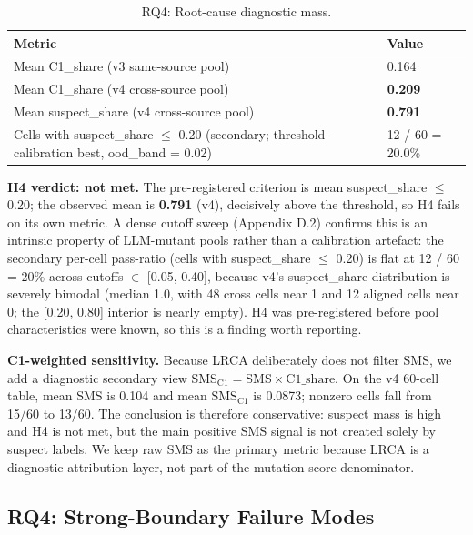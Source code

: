 \documentclass[manuscript,screen,review]{acmart}
\begin{document}
\begin{table}[t]
\caption{RQ4: Root-cause diagnostic mass.}
\label{tab:p2-13}
\centering
\begin{tabular}{ll}
\toprule
Metric & Value \\
\midrule
Mean C1\_share (v3 same-source pool) & 0.164 \\
Mean C1\_share (v4 cross-source pool) & \textbf{0.209} \\
Mean suspect\_share (v4 cross-source pool) & \textbf{0.791} \\
Cells with suspect\_share $\leq$ 0.20 (secondary; threshold-calibration best, ood\_band = 0.02) & 12 / 60 = 20.0\% \\
\bottomrule
\end{tabular}
\end{table}

\textbf{H4 verdict: not met.} The pre-registered criterion is mean
suspect\_share $\leq$ 0.20; the observed mean is \textbf{0.791} (v4),
decisively above the threshold, so H4 fails on its own metric. A dense
cutoff sweep (Appendix D.2) confirms this is an intrinsic property of
LLM-mutant pools rather than a calibration artefact: the secondary
per-cell pass-ratio (cells with suspect\_share $\leq$ 0.20) is flat at
12 / 60 = 20\% across cutoffs $\in$ {[}0.05, 0.40{]}, because v4's
suspect\_share distribution is severely bimodal (median 1.0, with 48
cross cells near 1 and 12 aligned cells near 0; the {[}0.20, 0.80{]}
interior is nearly empty). H4 was pre-registered before pool
characteristics were known, so this is a finding worth reporting.

\textbf{C1-weighted sensitivity.} Because LRCA deliberately does not
filter SMS, we add a diagnostic secondary view
$\mathrm{SMS}_{\mathrm{C1}} = \mathrm{SMS} \times \mathrm{C1\_share}$.
On the v4 60-cell table, mean SMS is 0.104 and mean
$\mathrm{SMS}_{\mathrm{C1}}$ is 0.0873; nonzero cells fall from 15/60 to
13/60. The conclusion is therefore conservative: suspect mass is high
and H4 is not met, but the main positive SMS signal is not created solely
by suspect labels. We keep raw SMS as the primary metric because LRCA is
a diagnostic attribution layer, not part of the mutation-score
denominator.

\subsection{RQ4: Strong-Boundary Failure Modes}\label{rq4-strong-boundary}
\end{document}
